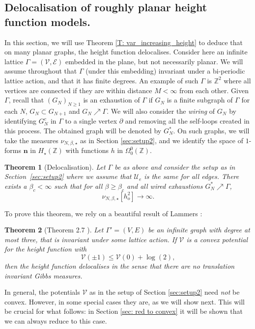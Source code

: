 \documentclass[11pt, reqno]{amsart}
\newtheorem{theorem}{Theorem}[section]
\numberwithin{equation}{section}
\theoremstyle{definition}
\theoremstyle{remark}
\newcommand{\ZZ}{\mathbb{Z}}
\renewcommand{\c}[1]{\ensuremath{\mathcal{#1}}}
\newcommand{\n}{\mathbf{n}}
\newcommand{\exact}{\star}
\newcommand{\Hcycle}{\ensuremath{H_{\star}}}
\begin{document}
\subsection{Delocalisation of roughly planar height function models.}
In this section, we will use Theorem \ref{T: var_increasing_height} to deduce that on many planar graphs, the height function delocalises. 
Consider here an infinite lattice $\Gamma = (\mathscr{V}, \mathscr{E})$ embedded in the plane, 
but not necessarily planar. We will assume throughout that $\Gamma$ (under this embedding) invariant under a bi-periodic lattice action, 
and that it has finite degrees. 
An example of such $\Gamma$ is $\ZZ^2$ where all vertices are connected if they are within distance $M < \infty$ from each other. 
Given $\Gamma$, recall that $(G_N)_{N \geq 1}$ is an exhaustion of $\Gamma$ if $G_N$ is a finite subgraph of $\Gamma$ for each $N$, $G_N \subset G_{N + 1}$ and $G_N \nearrow \Gamma$. 
We will also consider the \emph{wiring} of $G_N$ by identifying $G_N^c$ in $\Gamma$ to a single vertex $\partial$ and removing all the self-loops created in this process. 
The obtained graph will be denoted by $G_N^*$. 
On such graphs, we will take the measures $\nu_{N, \beta, \exact}$ as in Section \ref{sec:setup2}, and we identify the space of $1$-forms $\n$ in $\Hcycle(\mathbb{Z})$ with functions $h$ in $\Omega^0_0(\ZZ)$. 

\begin{theorem}[Delocalisation] \label{T: deloc}
	Let $\Gamma$ be as above and consider the setup as in Section~\ref{sec:setup2} where we assume that $\c{U}_e$ is the same for all edges. 
	There exists a $\beta_c < \infty$ such that for all $\beta \geq \beta_c$ and all wired exhaustions $G_N^* \nearrow \Gamma$, 
	\[
		\nu_{N, \beta, \exact}[h_o^2] \to \infty. 
	\]
\end{theorem}

To prove this theorem, we rely on a beautiful result of Lammers \cite{Lammers}:
\begin{theorem}[Theorem 2.7 \cite{Lammers}] \label{T: Lammers}
	Let $\Gamma' = (V, E)$ be an infinite graph with degree at most three, that is invariant under some lattice action. 
	If $\c{V}$ is a convex potential for the height function with
	\[
		\c{V}(\pm 1) \leq \c{V}(0) + \log(2), 
	\]
	then the height function delocalises in the sense that there are no translation invariant Gibbs measures. 
\end{theorem}

In general, the potentials $\c{V}$ as in the setup of Section \ref{sec:setup2} need \emph{not}  be convex. 
However, in some special cases they are, as we will show next.  
This will be crucial for what follows: in Section \ref{sec: red to convex} it will be shown that we can always reduce to this case. 
\end{document}
